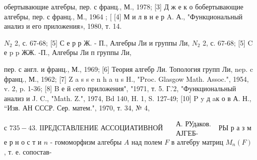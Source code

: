 \documentclass[10pt]{article}
\begin{document}
обертывающие алгебры, пер. с франц., М., 1978; [3] Д ж е к о бобертывающие алгебры, пер. с франц., М., 1964 ; [ [4] М и л в н е р A. А., "Функциональный анализ и его приложения», 1980, т. 14.

$N_{2}$ 2, с. 67-68; [5] С е р р Ж. - П., Алгебры Ли и группы Ли, $N_{2}$ 2, с. 67-68; [5] C е p p ЖЖ. -П., Алгебры Ли п группы Ли,

пер. с англ. и франц., М., 1969; [6] Теория алгебр Ли. Топология групп Ли, nep. c франц., М., 1962; [7] Z a s s e n h a u s H., "Proc. Glasgow Math. Assoc.", 1954, v. 2, p. 1-36; [8] B е й cего приложения", "1971, т. 5. Г.'2, "Функциональный анализ и J. C., "Math. Z.", 1974, Bd 140, H. 1, S. 127-49; [10] P y д aк о в А. Н., “Изв. АН СССР. Сер. матем.", 1970, т. 34, № 4,

с $735-43$. IІРЕДСТАВЛЕНИЕ АССОЦИАТИВНОЙ $\begin{aligned} & \text { А. РУдаков. } \\ & \text { АЈГЕБ- }\end{aligned}$ РЫ р а з м е р н о с т и $n$ - гомоморфизм алгебры $A$ над полем $F$ в алгебру матриц $M_{n}(F)$, т. е. сопостав-
\end{document}
